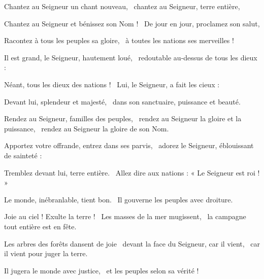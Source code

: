 \item Chantez au Seigneur un chant nouveau,~\psstar{} chantez au Seigneur, terre entière,
\item Chantez au Seigneur et bénissez son Nom !~\psstar{} De jour en jour, proclamez son salut,
\item Racontez à tous les peuples sa gloire,~\psstar{} à toutes les nations ses merveilles !
\item Il est grand, le Seigneur, hautement loué,~\psstar{} redoutable au-dessus de tous les dieux :
\item Néant, tous les dieux des nations !~\psstar{} Lui, le Seigneur, a fait les cieux :
\item Devant lui, splendeur et majesté,~\psstar{} dans son sanctuaire, puissance et beauté.
\item Rendez au Seigneur, familles des peuples,~\pscross{} rendez au Seigneur la gloire et la puissance,~\psstar{} rendez au Seigneur la gloire de son Nom. 
\item Apportez votre offrande, entrez dans ses parvis,~\psstar{} adorez le Seigneur, éblouissant de sainteté : 
\item Tremblez devant lui, terre entière.~\psstar{} Allez dire aux nations : « Le Seigneur est roi ! » 
\item Le monde, inébranlable, tient bon.~\psstar{} Il gouverne les peuples avec droiture.
\item Joie au ciel ! Exulte la terre !~\pscross{} Les masses de la mer mugissent,~\psstar{} la campagne tout entière est en fête. 
\item Les arbres des forêts dansent de joie~\pscross{} devant la face du Seigneur, car il vient,~\psstar{} car il vient pour juger la terre. 
\item Il jugera le monde avec justice,~\psstar{} et les peuples selon sa vérité !
